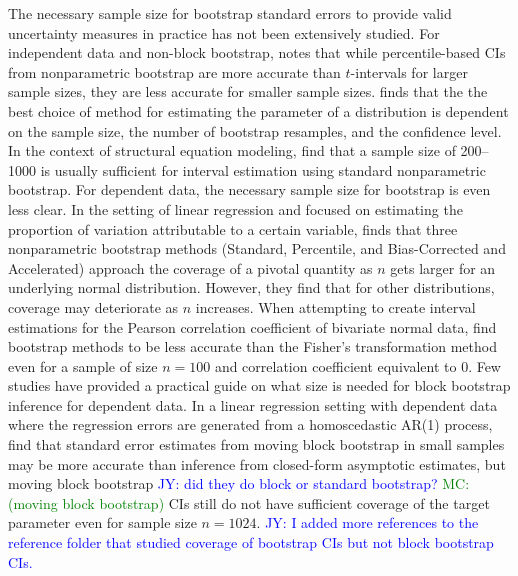 \documentclass[12pt, letterpaper, titlepage]{article}
\newcommand{\jy}[1]{\textcolor{blue}{JY: #1}}
\newcommand{\mc}[1]{\textcolor{green}{MC: (#1)}}
\begin{document}
The necessary sample size for bootstrap standard errors to provide valid
uncertainty measures in practice has not been extensively studied. For
independent data and non-block bootstrap, \citet{hesterberg2015teachers} notes
that while percentile-based CIs from nonparametric bootstrap
are more accurate than $t$-intervals for larger sample sizes, they are
less accurate for smaller sample sizes. \citet{chernick2009revisiting} finds that the the best choice of method for estimating
the parameter of a distribution is dependent on the sample size, the number of
bootstrap resamples, and the confidence level. In the context of structural equation
modeling, \citet{nevitt2001performance} find
that a sample size of 200--1000 is usually sufficient for interval estimation
using standard nonparametric bootstrap. For dependent data, the necessary
sample
size for bootstrap is even less clear. In the setting of linear regression and focused on estimating the proportion of 
variation attributable to a certain variable, \citet{burch2012nonparametric} finds
that three nonparametric bootstrap methods (Standard, Percentile, and Bias-Corrected and
Accelerated) approach the coverage of a pivotal quantity as $n$ gets larger for an
underlying normal distribution. However, they find that for other distributions, 
coverage may deteriorate as $n$ increases. 
When attempting to create interval estimations for the Pearson correlation 
coefficient of bivariate normal data, \citet{puth2015variety} find bootstrap 
methods to be less accurate than the Fisher's transformation method even 
for a sample of size $n = 100$ and correlation coefficient equivalent to $0$.
Few studies have provided a practical guide on what size is needed
for block bootstrap inference for dependent data.
In a linear regression setting
with
dependent data where the
regression errors are generated from a homoscedastic AR(1) process, 
\citet{goncalves2005bootstrap} find that standard error
estimates from moving 
block bootstrap in small samples may be more accurate than
inference from closed-form asymptotic estimates, but moving block bootstrap 
\jy{did they do block or standard bootstrap?}
\mc{moving block bootstrap}
CIs still do not have sufficient coverage of the target parameter even for sample size
$n = 1024$.
\jy{I added more references to the reference folder that studied coverage of
  bootstrap CIs but not block bootstrap CIs.}
\end{document}
